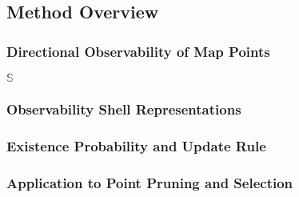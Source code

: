 \subsection{Method Overview}

\subsubsection{Directional Observability of Map Points}

$\mathbb{S}$

\subsubsection{Observability Shell Representations}

\subsubsection{Existence Probability and Update Rule}

\subsubsection{Application to Point Pruning and Selection}
